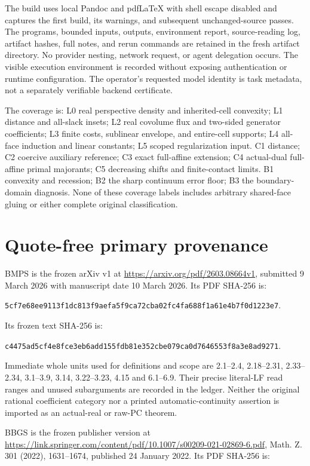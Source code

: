 \documentclass[
  11pt,
]{article}
\begin{document}
The build uses local Pandoc and pdfLaTeX with shell escape disabled and
captures the first build, its warnings, and subsequent unchanged-source
passes. The programs, bounded inputs, outputs, environment report,
source-reading log, artifact hashes, full notes, and rerun commands are
retained in the fresh artifact directory. No provider nesting, network
request, or agent delegation occurs. The visible execution environment
is recorded without exposing authentication or runtime configuration.
The operator's requested model identity is task metadata, not a
separately verifiable backend certificate.

The coverage is: L0 real perspective density and inherited-cell
convexity; L1 distance and all-slack insets; L2 real covolume flux and
two-sided generator coefficients; L3 finite costs, sublinear envelope,
and entire-cell supports; L4 all-face induction and linear constants; L5
scoped regularization input. C1 distance; C2 coercive auxiliary
reference; C3 exact full-affine extension; C4 actual-dual full-affine
primal majorants; C5 decreasing shifts and finite-contact limits. B1
convexity and recession; B2 the sharp continuum error floor; B3 the
boundary-domain diagnosis. None of these coverage labels includes
arbitrary shared-face gluing or either complete original classification.

\section{Quote-free primary
provenance}\label{quote-free-primary-provenance}

BMPS is the frozen arXiv v1 at \url{https://arxiv.org/pdf/2603.08664v1},
submitted 9 March 2026 with manuscript date 10 March 2026. Its PDF
SHA-256 is:

\texttt{5cf7e68ee9113f1dc813f9aefa5f9ca72cba02fc4fa688f1a61e4b7f0d1223e7}.

Its frozen text SHA-256 is:

\texttt{c4475ad5cf4e8fce3eb6add155fdb81e352cbe079ca0d7646553f8a3e8ad9271}.

Immediate whole units used for definitions and scope are 2.1--2.4,
2.18--2.31, 2.33--2.34, 3.1--3.9, 3.14, 3.22--3.23, 4.15 and 6.1--6.9.
Their precise literal-LF read ranges and unused subarguments are
recorded in the ledger. Neither the original rational coefficient
category nor a printed automatic-continuity assertion is imported as an
actual-real or raw-PC theorem.

BBGS is the frozen publisher version at
\url{https://link.springer.com/content/pdf/10.1007/s00209-021-02869-6.pdf},
Math. Z. 301 (2022), 1631--1674, published 24 January 2022. Its PDF
SHA-256 is:
\end{document}
